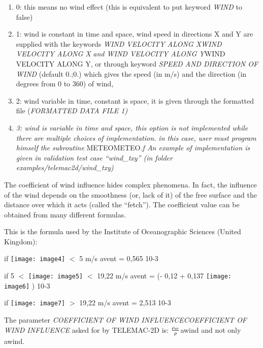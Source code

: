 \documentclass{article} %
\begin{document}
\begin{enumerate}
\item  0: this means no wind effect (this is equivalent to put keyword\textit{ WIND }to false)\textit{}

\item \textit{ }1: wind is constant in time and space, wind speed in directions X and Y are supplied with the keywords \textit{WIND VELOCITY ALONG XWIND VELOCITY ALONG X} \textit{and WIND VELOCITY ALONG Y}WIND VELOCITY ALONG Y, or through keyword\textit{ SPEED AND DIRECTION OF WIND }(default 0.;0.) which gives the speed (in m/s) and the direction (in degrees from 0 to 360) of wind,

\item  2: wind variable in time, constant is space, it is given through the formatted file (\textit{FORMATTED DATA FILE 1)}

\item  \textit{3: wind is variable in time and space, this option is not implemented while there are multiple choices of implementation. in this case, user must program himself the subroutine} METEOMETEO\textit{.f An example of implementation is given in validation test case ``wind\_txy'' (in folder examples/telemac2d/wind\_txy)}
\end{enumerate}

 The coefficient of wind influence hides complex phenomena. In fact, the influence of the wind depends on the smoothness (or, lack of it) of the free surface and the distance over which it acts (called the ``fetch''). The coefficient value can be obtained from many different formulas.

 This is the formula used by the Institute of Oceanographic Sciences (United Kingdom):



 if   \texttt{[image: image4]}  $<$ 5 m/s   avent  = 0,565 10-3

 if  5   $<$   \texttt{[image: image5]}  $<$ 19,22 m/s avent = (- 0,12 + 0,137   \texttt{[image: image6]}  ) 10-3

 if    \texttt{[image: image7]}    $>$ 19,22 m/s   avent = 2,513 10-3

 The parameter \textit{COEFFICIENT OF WIND INFLUENCECOEFFICIENT OF WIND INFLUENCE} asked for by TELEMAC-2D is: $\frac{{\rho }_{air}}{\mathrm{\rhoup }}$awind and not only awind.
\end{document}
